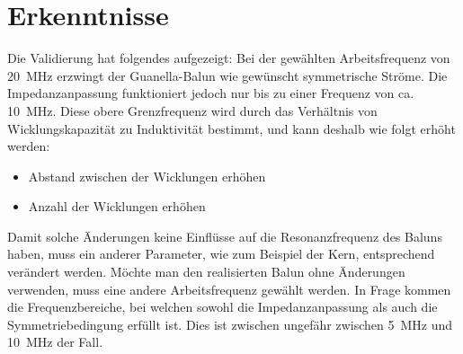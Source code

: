 \section{Erkenntnisse}
Die Validierung hat folgendes aufgezeigt: Bei der gewählten Arbeitsfrequenz von \SI{20}{MHz} erzwingt der Guanella-Balun wie gewünscht symmetrische Ströme. Die Impedanzanpassung funktioniert jedoch nur bis zu einer Frequenz von ca. \SI{10}{MHz}. Diese obere Grenzfrequenz wird durch das Verhältnis von Wicklungskapazität zu Induktivität bestimmt, und kann deshalb wie folgt erhöht werden:
\begin{itemize}
	\item Abstand zwischen der Wicklungen erhöhen
	\item Anzahl der Wicklungen erhöhen
\end{itemize}

Damit solche Änderungen keine Einflüsse auf die Resonanzfrequenz des Baluns haben, muss ein anderer Parameter, wie zum Beispiel der Kern, entsprechend verändert werden.
\vspace{1cm}
Möchte man den realisierten Balun ohne Änderungen verwenden, muss eine andere Arbeitsfrequenz gewählt werden. In Frage kommen die Frequenzbereiche, bei welchen sowohl die Impedanzanpassung als auch die Symmetriebedingung erfüllt ist. Dies ist zwischen ungefähr zwischen \SI{5}{MHz} und \SI{10}{MHz} der Fall. 
\vspace{1cm}

